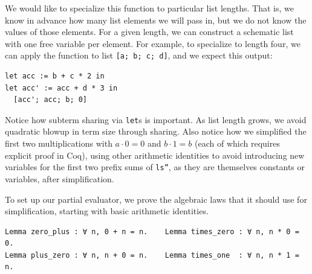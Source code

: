 We would like to specialize this function to particular list lengths.
That is, we know in advance how many list elements we will pass in, but we do not know the values of those elements.
For a given length, we can construct a schematic list with one free variable per element.
For example, to specialize to length four, we can apply the function to list \texttt{[a; b; c; d]}, and we expect this output:
\begin{verbatim}
let acc := b + c * 2 in
let acc' := acc + d * 3 in
  [acc'; acc; b; 0]
\end{verbatim}

Notice how subterm sharing via \texttt{let}s is important.
As list length grows, we avoid quadratic blowup in term size through sharing.
Also notice how we simplified the first two multiplications with $a \cdot 0 = 0$ and $b \cdot 1 = b$ (each of which requires explicit proof in Coq), using other arithmetic identities to avoid introducing new variables for the first two prefix sums of \texttt{ls''}, as they are themselves constants or variables, after simplification.

To set up our partial evaluator, we prove the algebraic laws that it should use for simplification, starting with basic arithmetic identities.
\begin{verbatim}
Lemma zero_plus : ∀ n, 0 + n = n.    Lemma times_zero : ∀ n, n * 0 = 0.
Lemma plus_zero : ∀ n, n + 0 = n.    Lemma times_one  : ∀ n, n * 1 = n.
\end{verbatim}

